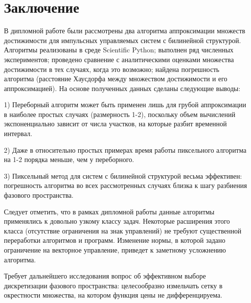 \section*{Заключение}
\label{sec:conclusion}

В дипломной работе были рассмотрены два алгоритма аппроксимации
множеств достижимости для импульсных управляемых систем с билинейной
структурой. Алгоритмы реализованы в среде Scientific Python; выполнен
ряд численных экспериментов; проведено сравнение с аналитическими
оценками множества достижимости в тех случаях, когда это возможно;
найдена погрешность алгоритма (расстояние Хаусдорфа между множеством
достижимости и его аппроксимацией). На основе полученных данных
сделаны следующие выводы:

1) Переборный алгоритм может быть применен лишь для грубой
аппроксимации в наиболее простых случаях (размерность 1-2), поскольку
объем вычислений экспоненциально зависит от числа участков, на которые
разбит временной интервал.

2) Даже в относительно простых примерах время работы пиксельного
алгоритма на 1-2 порядка меньше, чем у переборного.

3) Пиксельный метод для систем с билинейной структурой весьма
эффективен: погрешность алгоритма во всех рассмотренных случаях близка
к шагу разбиения фазового пространства.

Следует отметить, что в рамках дипломной работы данные алгоритмы
применялись к довольно узкому классу задач. Некоторые расширения этого
класса (отсутствие ограничения на знак управлений) не требуют
существенной переработки алгоритмов и программ. Изменение нормы, в
которой задано ограничение на векторное управление, приведет к
заметному усложнению алгоритма.

Требует дальнейшего исследования вопрос об эффективном выборе
дискретизации фазового пространства: целесообразно измельчать сетку в
окрестности множества, на котором функция цены не дифференцируема.

